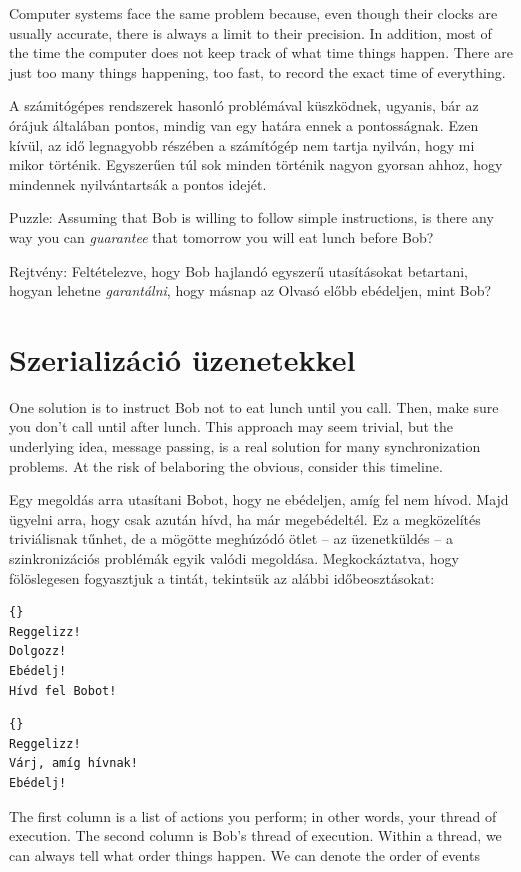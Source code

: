 \documentclass{book}
\newcommand{\clearemptydoublepage}{\newpage\cleardoublepage}
\begin{document}
Computer systems face the same problem because, even though their
clocks are usually accurate, there is always a limit to their
precision.  In addition, most of the time the computer does not keep
track of what time things happen.  There are just too many things
happening, too fast, to record the exact time of everything.

A számitógépes rendszerek hasonló problémával küszködnek, ugyanis,
bár az órájuk általában pontos, mindig van egy határa ennek a
pontosságnak. Ezen kívül, az idő legnagyobb részében a számítógép
nem tartja nyilván, hogy mi mikor történik. Egyszerűen túl sok minden
történik nagyon gyorsan ahhoz, hogy mindennek nyilvántartsák a pontos
idejét.

Puzzle: Assuming that Bob is willing to follow simple instructions, is
there any way you can {\em guarantee} that tomorrow you will eat lunch
before Bob?

Rejtvény: Feltételezve, hogy Bob hajlandó egyszerű utasításokat betartani,
hogyan lehetne {\em garantálni}, hogy másnap az Olvasó előbb ebédeljen, mint Bob?
 
\clearemptydoublepage
\section{Szerializáció üzenetekkel}
\label{serialization}

One solution is to instruct Bob not to eat lunch until you call.
Then, make sure you don't call until after lunch.  This approach may
seem trivial, but the underlying idea, message passing, is a real
solution for many synchronization problems.
At the risk of belaboring the obvious, consider this timeline.

Egy megoldás arra utasítani Bobot, hogy ne ebédeljen, amíg fel nem hívod.
Majd ügyelni arra, hogy csak azután hívd, ha már megebédeltél.
Ez a megközelítés triviálisnak tűnhet, de a mögötte meghúzódó ötlet
-- az üzenetküldés -- a szinkronizációs problémák egyik valódi megoldása.
Megkockáztatva, hogy fölöslegesen fogyasztjuk a tintát, tekintsük
az alábbi időbeosztásokat:

%
\begin{minipage}[t]{2in}
\begin{lstlisting}[title={„A” szál (Olvasó)}]{}
Reggelizz!
Dolgozz!
Ebédelj!
Hívd fel Bobot!
\end{lstlisting}
\end{minipage}
\hfill
\begin{minipage}[t]{2in}
\begin{lstlisting}[title={„B” szál (Bob)}]{}
Reggelizz!
Várj, amíg hívnak!
Ebédelj!
\end{lstlisting}
\end{minipage}
%
The first column is a list of actions you perform; in other words,
your thread of execution.  The second column is Bob's thread of
execution.  Within a thread, we can always tell what order things
happen.  We can denote the order of events
\end{document}
